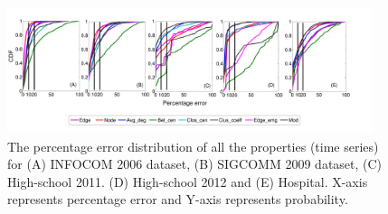 % 
% 
% 
% 
% 
%  
%  
 \begin{figure}
  \centering
  \includegraphics*[width=0.95\textwidth,angle=0]{./texfiles/Chapter_1/fig/error_dist_all-eps-converted-to.pdf}
 
 
 \caption{\label{fig8}  The percentage error distribution of all the properties (time series) for (A) INFOCOM 2006 dataset, (B) SIGCOMM 2009 dataset, (C) High-school 2011. (D) High-school 2012 and (E) Hospital. 
 X-axis represents percentage error and Y-axis represents 
 probability.}
\end{figure} 

\medskip
